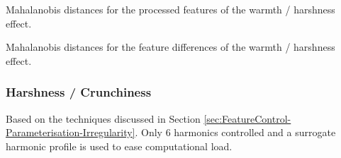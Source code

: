 			\begin{table}[h!]
				\centering
				
				\caption{Mahalanobis distances for the processed 
					 features of the warmth / harshness effect.}
				\label{tab:HarshProcJeff}
			\end{table}

			\begin{table}[h!]
				\centering
				
				\caption{Mahalanobis distances for the feature differences of 
					 the warmth / harshness effect.}
				\label{tab:HarshDiffJeff}
			\end{table}

		\subsubsection*{Harshness / Crunchiness}
			\note
			{
				Based on the techniques discussed in Section
				\ref{sec:FeatureControl-Parameterisation-Irregularity}. Only 6 harmonics controlled and a
				surrogate harmonic profile is used to ease computational load.
			}

